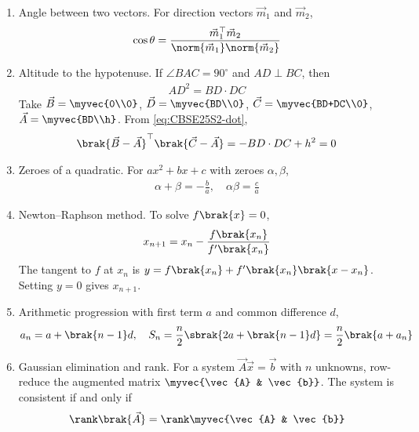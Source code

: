 \begin{enumerate}[label=\thesubsection.\arabic*, ref=\thesubsection.\theenumi]
\item Angle between two vectors. For direction vectors $\vec{m}_1$ and $\vec{m}_2$,
\begin{align}
	\cos\theta = \frac{\vec{m}_1^{\top}\vec{m}_2}{\norm{\vec{m}_1}\norm{\vec{m}_2}} \label{eq:CBSE25S2-angle}
\end{align}
\item Altitude to the hypotenuse. If $\angle BAC = 90^\circ$ and $AD \perp BC$, then
\begin{align}
	AD^2 = BD \cdot DC \label{eq:CBSE25S2-altitude}
\end{align}
\solution
Take $\vec{B} = \myvec{0\\0}$, $\vec{D} = \myvec{BD\\0}$, $\vec{C} = \myvec{BD+DC\\0}$, $\vec{A} = \myvec{BD\\h}$. From \eqref{eq:CBSE25S2-dot},
\begin{align}
	\brak{\vec{B}-\vec{A}}^{\top}\brak{\vec{C}-\vec{A}} = -BD\cdot DC + h^2 = 0
\end{align}
\item Zeroes of a quadratic. For $ax^2 + bx + c$ with zeroes $\alpha, \beta$,
\begin{align}
	\alpha + \beta = -\frac{b}{a}, \quad \alpha\beta = \frac{c}{a} \label{eq:CBSE25S2-zeroes}
\end{align}
\item Newton--Raphson method. To solve $f\brak{x} = 0$,
\begin{align}
	x_{n+1} = x_n - \frac{f\brak{x_n}}{f^{\prime}\brak{x_n}} \label{eq:CBSE25S2-newton}
\end{align}
\solution
The tangent to $f$ at $x_n$ is $y = f\brak{x_n} + f^{\prime}\brak{x_n}\brak{x - x_n}$. Setting $y = 0$ gives $x_{n+1}$.
\item Arithmetic progression with first term $a$ and common difference $d$,
\begin{align}
	a_n = a + \brak{n-1}d, \quad S_n = \frac{n}{2}\sbrak{2a + \brak{n-1}d} = \frac{n}{2}\brak{a + a_n} \label{eq:CBSE25S2-ap}
\end{align}
\item Gaussian elimination and rank. For a system $\vec{A}\vec{x} = \vec{b}$ with $n$ unknowns, row-reduce the augmented matrix $\myvec{\vec{A} & \vec{b}}$. The system is consistent if and only if
\begin{align}
	\rank\brak{\vec{A}} = \rank\myvec{\vec{A} & \vec{b}} \label{eq:CBSE25S2-rank}
\end{align}

\end{enumerate}
